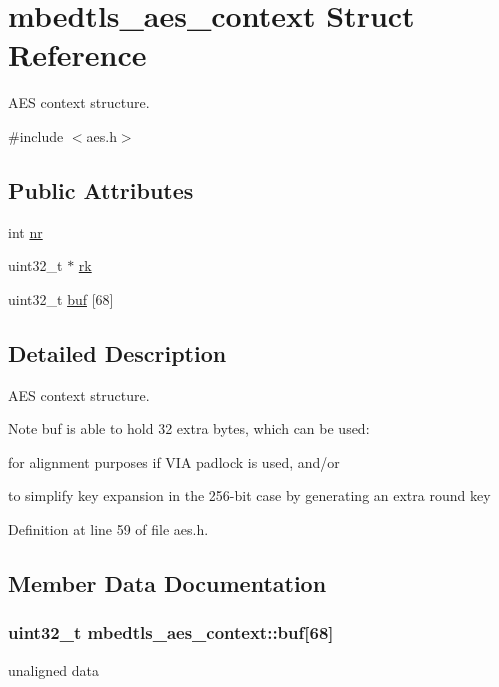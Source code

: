 \hypertarget{structmbedtls__aes__context}{\section{mbedtls\-\_\-aes\-\_\-context Struct Reference}
\label{structmbedtls__aes__context}
}


A\-E\-S context structure.  




{\ttfamily \#include $<$aes.\-h$>$}

\subsection*{Public Attributes}
\begin{DoxyCompactItemize}
\item 
int \hyperlink{structmbedtls__aes__context_ad0b4f626fa3881c76f23a9a96812b69a}{nr}
\item 
uint32\-\_\-t $\ast$ \hyperlink{structmbedtls__aes__context_ac7e235e5b270daba3635f5e39949b7a4}{rk}
\item 
uint32\-\_\-t \hyperlink{structmbedtls__aes__context_ad9a8f020a5028732e2cf3c8e07b39795}{buf} \mbox{[}68\mbox{]}
\end{DoxyCompactItemize}


\subsection{Detailed Description}
A\-E\-S context structure. 

\begin{DoxyNote}{Note}
buf is able to hold 32 extra bytes, which can be used\-:
\begin{DoxyItemize}
\item for alignment purposes if V\-I\-A padlock is used, and/or
\item to simplify key expansion in the 256-\/bit case by generating an extra round key 
\end{DoxyItemize}
\end{DoxyNote}


Definition at line 59 of file aes.\-h.



\subsection{Member Data Documentation}
\hypertarget{structmbedtls__aes__context_ad9a8f020a5028732e2cf3c8e07b39795}{
\subsubsection[{buf}]{\setlength{\rightskip}{0pt plus 5cm}uint32\-\_\-t mbedtls\-\_\-aes\-\_\-context\-::buf\mbox{[}68\mbox{]}}}\label{structmbedtls__aes__context_ad9a8f020a5028732e2cf3c8e07b39795}
unaligned data 

